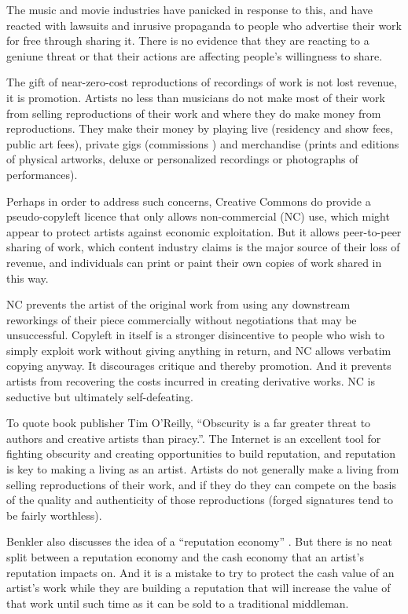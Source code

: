 \documentclass[11pt, a4]{article}
\begin{document}
The music and movie industries have panicked in response to this, and have reacted with lawsuits and inrusive propaganda to people who advertise their work for free through sharing it. There is no evidence that they are reacting to a geniune threat or that their actions are affecting people's willingness to share.

The gift of near-zero-cost reproductions of recordings of work is not lost revenue, it is promotion. Artists no less than musicians do not make most of their work from selling reproductions of their work and where they do make money from reproductions. They make their money by playing live (residency and show fees, public art fees), private gigs (commissions ) and merchandise (prints and editions of physical artworks, deluxe or personalized recordings or photographs of performances). 

Perhaps in order to address such concerns, Creative Commons do provide a pseudo-copyleft licence that only allows non-commercial (NC) use, which might appear to protect artists against economic exploitation. But it allows peer-to-peer sharing of work, which content industry claims is the major source of their loss of revenue, and individuals can print or paint their own copies of work shared in this way. 

NC prevents the artist of the original work from using any downstream reworkings of their piece commercially without negotiations that may be unsuccessful. Copyleft in itself is a stronger disincentive to people who wish to simply exploit work without giving anything in return, and NC allows verbatim copying anyway. It discourages critique and thereby promotion. And it prevents artists from recovering the costs incurred in creating derivative works\cite{Negativland1998}. NC is seductive but ultimately self-defeating. 

To quote book publisher Tim O'Reilly, ``Obscurity is a far greater threat to authors and creative artists than piracy.''\cite{OReilly2002}. The Internet is an excellent tool for fighting obscurity and creating opportunities to build reputation, and reputation is key to making a living as an artist. Artists do not generally make a living from selling reproductions of their work, and if they do they can compete on the basis of the quality and authenticity of those reproductions (forged signatures tend to be fairly worthless).

Benkler also discusses the idea of a ``reputation economy'' \cite{Benkler2006}. But there is no neat split between a reputation economy and the cash economy that an artist's reputation impacts on. And it is a mistake to try to protect the cash value of an artist's work while they are building a reputation that will increase the value of that work until such time as it can be sold to a traditional middleman. 
\end{document}
